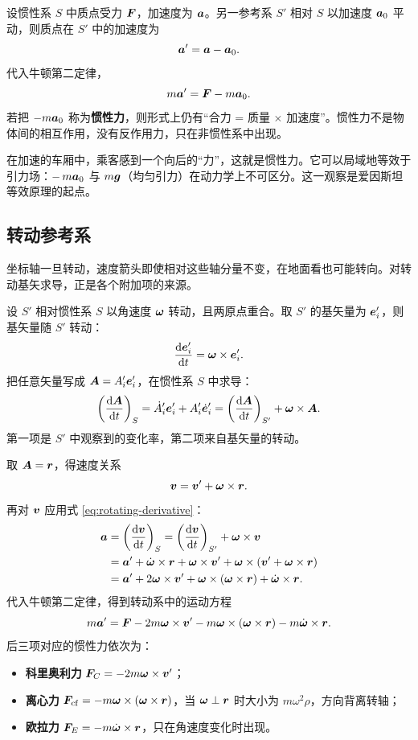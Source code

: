 设惯性系 $S$ 中质点受力 $\bF$，加速度为 $\ba$。另一参考系 $S'$ 相对 $S$ 以加速度 $\ba_0$ 平动，则质点在 $S'$ 中的加速度为
\[
\ba'=\ba-\ba_0.
\]
代入牛顿第二定律，
\begin{equation}
m\ba'=\bF-m\ba_0 .
\label{eq:accel-frame}
\end{equation}
若把 $-m\ba_0$ 称为\textbf{惯性力}，则形式上仍有“合力 = 质量 $\times$ 加速度”。惯性力不是物体间的相互作用，没有反作用力，只在非惯性系中出现。

\begin{physicsbox}
在加速的车厢中，乘客感到一个向后的“力”，这就是惯性力。它可以局域地等效于引力场：$-\,m\ba_0$ 与 $m\bg$（均匀引力）在动力学上不可区分。这一观察是爱因斯坦等效原理的起点。
\end{physicsbox}

\subsection{转动参考系}

坐标轴一旦转动，速度箭头即使相对这些轴分量不变，在地面看也可能转向。对转动基矢求导，正是各个附加项的来源。

设 $S'$ 相对惯性系 $S$ 以角速度 $\bom$ 转动，且两原点重合。取 $S'$ 的基矢量为 $\be_i'$，则基矢量随 $S'$ 转动：
\begin{equation}
\dv{\be_i'}{t}=\bom\times\be_i'.
\end{equation}
把任意矢量写成 $\bA=A_i'\be_i'$，在惯性系 $S$ 中求导：
\begin{equation}
\left(\dv{\bA}{t}\right)_S
=\dot A_i'\be_i'+A_i'\dot{\be}_i'
=\left(\dv{\bA}{t}\right)_{S'}+\bom\times\bA .
\label{eq:rotating-derivative}
\end{equation}
第一项是 $S'$ 中观察到的变化率，第二项来自基矢量的转动。

取 $\bA=\br$，得速度关系
\begin{equation}
\bv=\bv'+\bom\times\br .
\label{eq:rotating-velocity}
\end{equation}
再对 $\bv$ 应用式 \eqref{eq:rotating-derivative}：
\begin{align}
\ba&=\left(\dv{\bv}{t}\right)_S
=\left(\dv{\bv}{t}\right)_{S'}+\bom\times\bv \nonumber\\
&=\ba'+\dot{\bom}\times\br+\bom\times\bv'
+\bom\times(\bv'+\bom\times\br)\nonumber\\
&=\ba'+2\bom\times\bv'+\bom\times(\bom\times\br)
+\dot{\bom}\times\br .
\label{eq:rotating-acceleration}
\end{align}
代入牛顿第二定律，得到转动系中的运动方程
\begin{equation}
m\ba'=\bF
-2m\bom\times\bv'
-m\bom\times(\bom\times\br)
-m\dot{\bom}\times\br .
\label{eq:rotating-eom}
\end{equation}
后三项对应的惯性力依次为：
\begin{itemize}[leftmargin=2.2em]
  \item \textbf{科里奥利力} $\bF_C=-2m\bom\times\bv'$；
  \item \textbf{离心力} $\bF_{\rm cf}=-m\bom\times(\bom\times\br)$，当 $\bom\perp\br$ 时大小为 $m\omega^2\rho$，方向背离转轴；
  \item \textbf{欧拉力} $\bF_E=-m\dot{\bom}\times\br$，只在角速度变化时出现。
\end{itemize}

